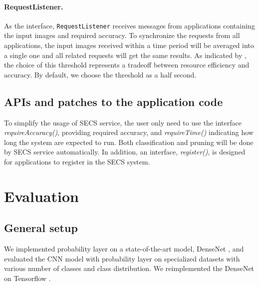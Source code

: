 \documentclass[pageno]{jpaper}
\begin{document}
\paragraph{RequestListener.}
As the interface, \texttt{RequestListener} receives messages from applications containing the input images and required accuracy. To synchronize the requests from all applications, the input images received within a time period will be averaged into a single one and all related requests will get the same results. As indicated by \cite{guo2018potluck, jiang2018mainstream}, the choice of this threshold represents a tradeoff between resource efficiency and accuracy. By default, we choose the threshold as a half second.

\subsection{APIs and patches to the application code}
To simplify the usage of SECS service, the user only need to use the interface \textit{requireAccuracy()}, providing required accuracy, and \textit{requireTime()} indicating how long the system are expected to run. Both classification and pruning will be done by SECS service automatically. In addition, an interface, \textit{register()}, is designed for applications to register in the SECS system.




\section{Evaluation} \label{evaluation}

\subsection{General setup}
We implemented probability layer on a state-of-the-art model, DenseNet \cite{huang2017densely}, and evaluated the CNN model with probability layer on specialized datasets with various number of classes and class distribution. We reimplemented the DenseNet on Tensorflow \cite{abadi2016tensorflow}.
\end{document}

